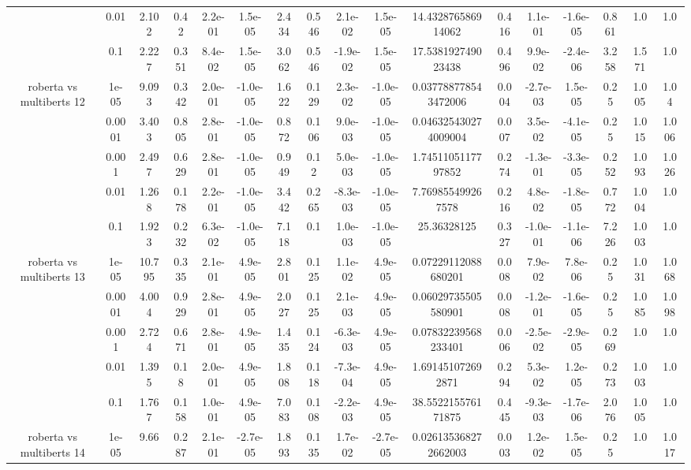 \begin{tabular}{|c|c|c|c|c|c|c|c|c|c|c|c|c|c|c|c|c|}
 & 0.01 & 2.102 & 0.42 & 2.2e-01 & 1.5e-05 & 2.434 & 0.546 & 2.1e-02 & 1.5e-05 & 14.432876586914062 & 0.416 & 1.1e-01 & -1.6e-05 & 0.861 & 1.0 & 1.0 \\
 & 0.1 & 2.227 & 0.351 & 8.4e-02 & 1.5e-05 & 3.062 & 0.546 & -1.9e-02 & 1.5e-05 & 17.538192749023438 & 0.496 & 9.9e-02 & -2.4e-06 & 3.258 & 1.571 & 1.0 \\
\hline
\multirow{5}{*}{roberta  vs multiberts 12} & 1e-05 & 9.093 & 0.342 & 2.0e-01 & -1.0e-05 & 1.622 & 0.129 & 2.3e-02 & -1.0e-05 & 0.037788778543472006 & 0.004 & -2.7e-03 & 1.5e-05 & 0.25 & 1.005 & 1.04 \\
 & 0.0001 & 3.403 & 0.805 & 2.8e-01 & -1.0e-05 & 0.872 & 0.106 & 9.0e-03 & -1.0e-05 & 0.046325430274009004 & 0.007 & 3.5e-02 & -4.1e-05 & 0.25 & 1.015 & 1.006 \\
 & 0.001 & 2.497 & 0.629 & 2.8e-01 & -1.0e-05 & 0.949 & 0.12 & 5.0e-03 & -1.0e-05 & 1.7451105117797852 & 0.274 & -1.3e-01 & -3.3e-05 & 0.252 & 1.093 & 1.026 \\
 & 0.01 & 1.268 & 0.178 & 2.2e-01 & -1.0e-05 & 3.442 & 0.265 & -8.3e-03 & -1.0e-05 & 7.769855499267578 & 0.216 & 4.8e-02 & -1.8e-05 & 0.772 & 1.004 & 1.0 \\
 & 0.1 & 1.923 & 0.232 & 6.3e-02 & -1.0e-05 & 7.118 & 0.1 & 1.0e-03 & -1.0e-05 & 25.36328125 & 0.327 & -1.0e-01 & -1.1e-06 & 7.226 & 1.003 & 1.0 \\
\hline
\multirow{5}{*}{roberta  vs multiberts 13} & 1e-05 & 10.795 & 0.335 & 2.1e-01 & 4.9e-05 & 2.801 & 0.125 & 1.1e-02 & 4.9e-05 & 0.07229112088680201 & 0.008 & 7.9e-02 & 7.8e-06 & 0.25 & 1.031 & 1.068 \\
 & 0.0001 & 4.004 & 0.929 & 2.8e-01 & 4.9e-05 & 2.027 & 0.125 & 2.1e-03 & 4.9e-05 & 0.06029735505580901 & 0.008 & -1.2e-01 & -1.6e-05 & 0.25 & 1.085 & 1.098 \\
 & 0.001 & 2.724 & 0.671 & 2.8e-01 & 4.9e-05 & 1.435 & 0.124 & -6.3e-03 & 4.9e-05 & 0.07832239568233401 & 0.006 & -2.5e-02 & -2.9e-05 & 0.269 & 1.0 & 1.0 \\
 & 0.01 & 1.395 & 0.18 & 2.0e-01 & 4.9e-05 & 1.808 & 0.118 & -7.3e-04 & 4.9e-05 & 1.691451072692871 & 0.294 & 5.3e-02 & 1.2e-05 & 0.273 & 1.003 & 1.0 \\
 & 0.1 & 1.767 & 0.158 & 1.0e-01 & 4.9e-05 & 7.083 & 0.108 & -2.2e-03 & 4.9e-05 & 38.552215576171875 & 0.445 & -9.3e-03 & -1.7e-06 & 2.076 & 1.005 & 1.0 \\
\hline
\multirow{5}{*}{roberta  vs multiberts 14} & 1e-05 & 9.66 & 0.287 & 2.1e-01 & -2.7e-05 & 1.893 & 0.135 & 1.7e-02 & -2.7e-05 & 0.026135368272662003 & 0.003 & 1.2e-02 & 1.5e-05 & 0.25 & 1.0 & 1.017 \\

\end{tabular}
